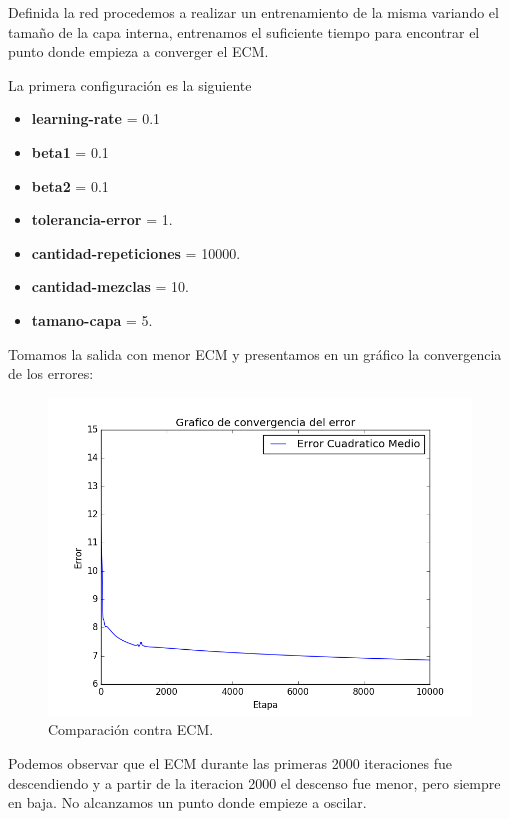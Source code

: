 \documentclass[onecolumn,10pt]{article}
\begin{document}
Definida la red procedemos a realizar  un entrenamiento de la misma 
variando el tamaño de la capa interna, entrenamos el suficiente tiempo para
encontrar el punto donde empieza a converger el ECM.

La primera configuración es la siguiente

\begin{itemize}
\item \textbf{learning-rate} = 0.1
\item \textbf{beta1} = 0.1
\item \textbf{beta2} = 0.1
\item \textbf{tolerancia-error} = 1.
\item \textbf{cantidad-repeticiones} = 10000.
\item \textbf{cantidad-mezclas} = 10.
\item \textbf{tamano-capa} = 5.
\end{itemize}


Tomamos la salida con menor ECM y presentamos en un gráfico la convergencia
de los errores:

\begin{figure}[H]
  \centering
  \includegraphics[width=0.8\columnwidth]{red_5_ecm.png}
  \caption{Comparación contra ECM.}
  \label{fig:red 5 ECM}
\end{figure}




Podemos observar que el ECM durante las primeras 2000 iteraciones fue descendiendo
y a partir de la iteracion 2000 el descenso fue menor, pero siempre en baja.
No alcanzamos un punto donde empieze a oscilar.
\end{document}
